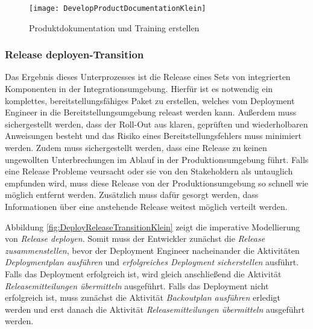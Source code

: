 \begin{figure}[!htbp]
\begin{center}
  \texttt{[image: DevelopProductDocumentationKlein]} %
  \caption{Produktdokumentation und Training erstellen}
  \label{fig:DevelopProductDocumentationKlein}
\end{center}
\end{figure}


\subsubsection{Release deployen-Transition}


Das Ergebnis dieses Unterprozesses ist die Release eines Sets von integrierten Komponenten in der Integrationsumgebung. \newline
Hierfür ist es notwendig ein komplettes, bereitstellungsfähiges Paket zu erstellen, welches vom Deployment Engineer in die Bereitstellungsumgebung releast werden kann.\newline
 Außerdem muss sichergestellt werden, dass der Roll-Out aus klaren, geprüften und wiederholbaren Anweisungen besteht und das Risiko eines Bereitstellungsfehlers muss minimiert werden. \newline
 Zudem muss sichergestellt werden, dass eine Release zu keinen ungewollten Unterbrechungen im Ablauf in der Produktionsumgebung führt. \newline
 Falls eine Release Probleme veursacht oder sie von den Stakeholdern als untauglich empfunden wird, muss diese Release von der Produktionsumgebung so schnell wie möglich entfernt werden. \newline
 Zusätzlich muss dafür gesorgt werden, dass Informationen über eine anstehende Release weitest möglich verteilt werden.\newline
 
  Abbildung \ref{fig:DeployReleaseTransitionKlein} zeigt die imperative Modellierung von \textit{Release deployen}.\newline
  Somit muss der Entwickler zunächst die \textit{Release zusammenstellen}, bevor der Deployment Engineer nacheinander die Aktivitäten \textit{Deploymentplan ausführen} und \textit{erfolgreiches Deployment sicherstellen} ausführt. Falls das Deployment erfolgreich ist, wird gleich anschließend die Aktivität \textit{Releasemitteilungen übermitteln} ausgeführt. Falls das Deployment nicht erfolgreich ist, muss zunächst die Aktivität \textit{Backoutplan ausführen} erledigt werden und erst danach die Aktivität \textit{Releasemitteilungen übermitteln} ausgeführt werden.


